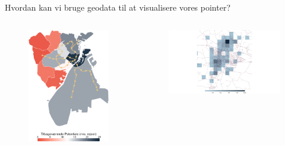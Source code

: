 \documentclass[
  8pt,
  ignorenonframetext,
  aspectratio=169]{beamer}
\newcommand{\columnsbegin}{\begin{columns}}
\newcommand{\columnsend}{\end{columns}}
\begin{document}
\begin{frame}{Hvordan kan vi bruge geodata til at visualisere vores
pointer?}
\protect\hypertarget{hvordan-kan-vi-bruge-geodata-til-at-visualisere-vores-pointer-1}{}
\columnsbegin


\begin{figure}[H]
    \centering
    \includegraphics[width=.70\textwidth]{pictures/potentialeudnyttelse_absolut.png}
\end{figure}


\begin{figure}[H]
    \centering
    \includegraphics[width=.99\textwidth]{pictures/hex_ringsted.png}
\end{figure}

\columnsend
\end{frame}
\end{document}
